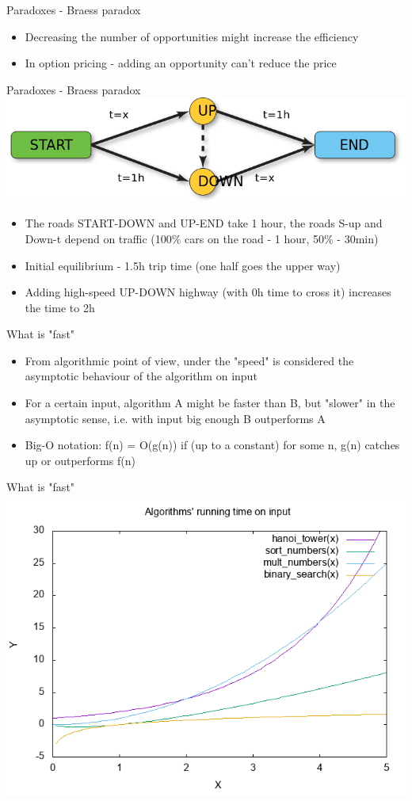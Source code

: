 \documentclass[presentation]{beamer}
\begin{document}
\begin{frame}[label=sec-2-18]{Paradoxes - Braess paradox}
\begin{itemize}
\item Decreasing the number of opportunities might increase the efficiency
\item In option pricing - adding an opportunity can't reduce the price
\end{itemize}
\end{frame}
\begin{frame}[label=sec-2-19]{Paradoxes - Braess paradox}
\includegraphics[width=.9\linewidth]{./img/braess.png}
\begin{itemize}
\item The roads START-DOWN and UP-END take 1 hour, the roads S-up and Down-t depend on traffic (100\% cars on the road - 1 hour, 50\% - 30min)
\item Initial equilibrium - 1.5h trip time (one half goes the upper way)
\item Adding high-speed UP-DOWN highway (with 0h time to cross it) increases the time to 2h
\end{itemize}
\end{frame}
\begin{frame}[label=sec-2-20]{What is "fast"}
\begin{itemize}
\item From algorithmic point of view, under the "speed" is considered the asymptotic behaviour of the algorithm on input
\item For a certain input, algorithm A might be faster than B, but "slower" in the asymptotic sense, i.e. with input big enough B outperforms A
\item Big-O notation: f(n) = O(g(n)) if (up to a constant) for some n,  g(n) catches up or outperforms f(n)
\end{itemize}
\end{frame}
\begin{frame}[label=sec-2-21]{What is "fast"}
\includegraphics[width=.9\linewidth]{file.png}
\end{frame}
\end{document}
